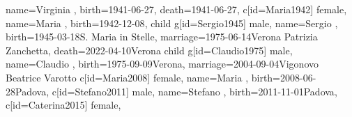 \documentclass{article}
\begin{document}
\begin{midpage}
\begin{center}
\begin{genealogypicture}
{{{{{{{{{{{{                                                name={Virginia },
                                                birth={1941-06-27}{},
                                                death={1941-06-27}{},
                                            }
                                            c[id=Maria1942]{
                                                female,
                                                name={Maria },
                                                birth={1942-12-08}{},
                                            }
                                            child{
                                                g[id=Sergio1945]{
                                                    male,
                                                    name={Sergio },
                                                    birth={1945-03-18}{S. Maria in Stelle},
                                                    marriage={1975-06-14}{Verona \newline Patrizia Zanchetta},
                                                    death={2022-04-10}{Verona}
                                                }
                                                child{
                                                    g[id=Claudio1975]{
                                                        male,
                                                        name={Claudio },
                                                        birth={1975-09-09}{Verona},
                                                        marriage={2004-09-04}{Vigonovo \newline Beatrice Varotto}
                                                    }
                                                    c[id=Maria2008]{
                                                        female,
                                                        name={Maria },
                                                        birth={2008-06-28}{Padova},
                                                    }
                                                    c[id=Stefano2011]{
                                                        male,
                                                        name={Stefano },
                                                        birth={2011-11-01}{Padova},
                                                    }
                                                    c[id=Caterina2015]{
                                                        female,
}}}}}}}}}}}}}}
\end{genealogypicture}
\end{center}
\end{midpage}
\end{document}

